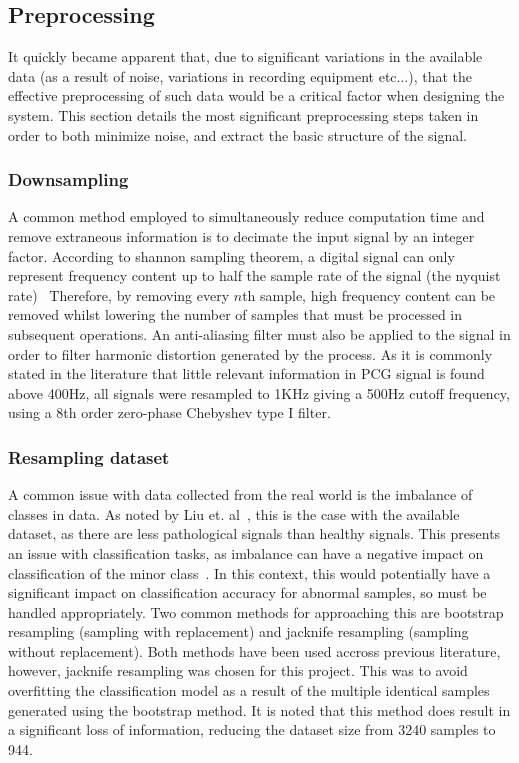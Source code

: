 \documentclass[titlepage, 12pt]{scrartcl} \usepackage{enumitem}
\begin{document}

\subsection{Preprocessing}\label{preprocessing}
It quickly became apparent that, due to significant variations in the available
data (as a result of noise, variations in recording equipment etc...), that the
effective preprocessing of such data would be a critical factor when designing
the system. This section details the most significant preprocessing steps taken
in order to both minimize noise, and extract the basic structure of the signal.

\subsubsection{Downsampling}
A common method employed to simultaneously reduce computation time and remove
extraneous information is to decimate the input signal by an integer factor.
According to shannon sampling theorem, a digital signal can only represent
frequency content up to half the sample rate of the signal (the nyquist
rate)~\parencite[p.140]{Kadis1999}
Therefore, by removing every $n$th sample, high frequency content can be
removed whilst lowering the number of samples that must be processed in
subsequent operations. An anti-aliasing filter must also be applied to the
signal in order to filter harmonic distortion generated by the process.
As it is commonly stated in the literature that little relevant information in
PCG signal is found above 400Hz, all signals were resampled to 1KHz giving a
500Hz cutoff frequency, using a 8th order zero-phase Chebyshev type I filter.

\subsubsection{Resampling dataset}\label{Resample}
A common issue with data collected from the real world is the imbalance of
classes in data. As noted by Liu et. al~\parencite{Liu2016}, this is the case
with the available dataset, as there are less pathological signals than healthy
signals.  This presents an issue with classification tasks, as imbalance can
have a negative impact on classification of the minor
class~\parencite{Longadge2013}. In this context, this would potentially have a
significant impact on classification accuracy for abnormal samples, so must be
handled appropriately.
Two common methods for approaching this are bootstrap resampling (sampling with
replacement) and jacknife resampling (sampling without replacement). Both
methods have been used accross previous literature, however, jacknife
resampling was chosen for this project. This was to avoid overfitting the
classification model as a result of
the multiple identical samples generated using the bootstrap method. It is
noted that this method does result in a significant loss of information,
reducing the dataset size from 3240 samples to 944.
\end{document}
